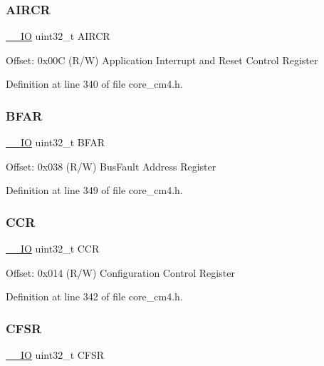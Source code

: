 \subsubsection{\texorpdfstring{A\+I\+R\+CR}{AIRCR}}
{\footnotesize\ttfamily \hyperlink{group___c_m_s_i_s__core__definitions_gaec43007d9998a0a0e01faede4133d6be}{\+\_\+\+\_\+\+IO} uint32\+\_\+t A\+I\+R\+CR}

Offset\+: 0x00C (R/W) Application Interrupt and Reset Control Register 

Definition at line 340 of file core\+\_\+cm4.\+h.

\mbox{\label{struct_s_c_b___type_ad49f99b1c83dcab356579af171bfa475}} 
\subsubsection{\texorpdfstring{B\+F\+AR}{BFAR}}
{\footnotesize\ttfamily \hyperlink{group___c_m_s_i_s__core__definitions_gaec43007d9998a0a0e01faede4133d6be}{\+\_\+\+\_\+\+IO} uint32\+\_\+t B\+F\+AR}

Offset\+: 0x038 (R/W) Bus\+Fault Address Register 

Definition at line 349 of file core\+\_\+cm4.\+h.

\mbox{\label{struct_s_c_b___type_a5e1322e27c40bf91d172f9673f205c97}} 
\subsubsection{\texorpdfstring{C\+CR}{CCR}}
{\footnotesize\ttfamily \hyperlink{group___c_m_s_i_s__core__definitions_gaec43007d9998a0a0e01faede4133d6be}{\+\_\+\+\_\+\+IO} uint32\+\_\+t C\+CR}

Offset\+: 0x014 (R/W) Configuration Control Register 

Definition at line 342 of file core\+\_\+cm4.\+h.

\mbox{\label{struct_s_c_b___type_ae6b1e9cde3f94195206c016214cf3936}} 
\subsubsection{\texorpdfstring{C\+F\+SR}{CFSR}}
{\footnotesize\ttfamily \hyperlink{group___c_m_s_i_s__core__definitions_gaec43007d9998a0a0e01faede4133d6be}{\+\_\+\+\_\+\+IO} uint32\+\_\+t C\+F\+SR}

